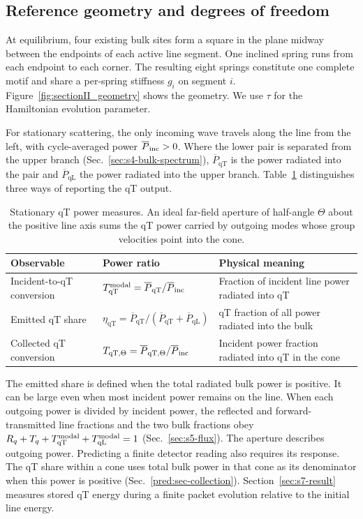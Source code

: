 \documentclass[10pt,aps,onecolumn,floatfix,notitlepage,nofootinbib,showkeys]{revtex4-2}
\newcommand{\qT}{\mathrm{qT}}
\newcommand{\qL}{\mathrm{qL}}
\begin{document}
\subsection{Reference geometry and degrees of freedom}
\label{sec:s2-geometry}

At equilibrium, four existing bulk sites form a square in the plane midway between the endpoints of each active line segment. One inclined spring runs from each endpoint to each corner. The resulting eight springs constitute one complete motif and share a per-spring stiffness $g_i$ on segment $i$. Figure~\ref{fig:sectionII_geometry} shows the geometry. We use $\tau$ for the Hamiltonian evolution parameter.

For stationary scattering, the only incoming wave travels along the line from the left, with cycle-averaged power $\overline P_{\rm inc}>0$. Where the lower pair is separated from the upper branch (Sec.~\ref{sec:s4-bulk-spectrum}), $\overline P_{\qT}$ is the power radiated into the pair and $\overline P_{\qL}$ the power radiated into the upper branch. Table~\ref{tab:power-observables} distinguishes three ways of reporting the qT output.

\begin{table}[!htbp]
\centering
\caption{Stationary qT power measures. An ideal far-field aperture of half-angle $\Theta$ about the positive line axis sums the qT power carried by outgoing modes whose group velocities point into the cone.}
\label{tab:power-observables}
\begin{ruledtabular}
\begin{tabular}{lll}
Observable & Power ratio & Physical meaning\\
\hline
Incident-to-qT conversion &
$T_{\qT}^{\rm modal}=\overline P_{\qT}/\overline P_{\rm inc}$ &
Fraction of incident line power radiated into qT\\
Emitted qT share &
$\eta_{\qT}=\overline P_{\qT}/(\overline P_{\qT}+\overline P_{\qL})$ &
qT fraction of all power radiated into the bulk\\
Collected qT conversion &
$T_{\qT,\Theta}=\overline P_{\qT,\Theta}/\overline P_{\rm inc}$ &
Incident power fraction radiated into qT in the cone\\
\end{tabular}
\end{ruledtabular}
\end{table}

The emitted share is defined when the total radiated bulk power is positive. It can be large even when most incident power remains on the line. When each outgoing power is divided by incident power, the reflected and forward-transmitted line fractions and the two bulk fractions obey $R_q+T_q+T_{\qT}^{\rm modal}+T_{\qL}^{\rm modal}=1$ (Sec.~\ref{sec:s5-flux}). The aperture describes outgoing power. Predicting a finite detector reading also requires its response. The qT share within a cone uses total bulk power in that cone as its denominator when this power is positive (Sec.~\ref{pred:sec-collection}). Section~\ref{sec:s7-result} measures stored qT energy during a finite packet evolution relative to the initial line energy.
\end{document}

